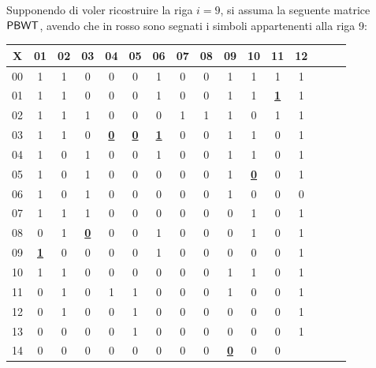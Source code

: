 \begin{esempio}
   Supponendo di voler ricostruire la riga $i=9$, si assuma la seguente matrice
   $\mbox{\rm {\sf PBWT}}$, avendo che in rosso sono segnati i simboli appartenenti alla riga 9: 
   \begin{table}[H]
     \centering
     \footnotesize
     \begin{tabular}{c|ccccccccccccccc}
       X & 01 & 02 & 03 & 04 & 05 & 06 & 07 & 08 & 09 & 10 & 11 & 12 \\
       \hline
       00 & 1 & 1 & 0 & 0 & 0 & 1 & 0 & 0 & 1 & 1 & 1 & 1 \\
       01 & 1 & 1 & 0 & 0 & 0 & 1 & 0 & 0 & 1 & 1 & {\color{nordred}\textbf{\underline{1}}}
                                                                & 1 \\
       02 & 1 & 1 & 1 & 0 & 0 & 0 & 1 & 1 & 1 & 0 & 1 & 1 \\
       03 & 1 & 1 & 0 & {\color{nordred}\textbf{\underline{0}}} & {\color{nordred}\textbf{\underline{0}}}
                                  & {\color{nordred}\textbf{\underline{1}}} & 0 & 0 & 1 & 1
                                                           & 0 & 1 \\
       04 & 1 & 0 & 1 & 0 & 0 & 1 & 0 & 0 & 1 & 1 & 0 & 1 \\
       05 & 1 & 0 & 1 & 0 & 0 & 0 & 0 & 0 & 1 & {\color{nordred}\textbf{\underline{0}}} & 0
                                                                & 1 \\
       06 & 1 & 0 & 1 & 0 & 0 & 0 & 0 & 0 & 1 & 0 & 0 & 0 \\
       07 & 1 & 1 & 1 & 0 & 0 & 0 & 0 & 0 & 0 & 1 & 0 & 1 \\
       08 & 0 & 1 & {\color{nordred}\textbf{\underline{0}}} & 0 & 0 & 1 & 0 & 0 & 0 & 1 & 0
                                                                & 1 \\
       09 & {\color{nordred}\textbf{\underline{1}}} & 0 & 0 & 0 & 0 & 1 & 0 & 0 & 0 & 0 & 0
                                                                & 1 \\
       10 & 1 & 1 & 0 & 0 & 0 & 0 & 0 & 0 & 1 & 1 & 0 & 1 \\
       11 & 0 & 1 & 0 & 1 & 1 & 0 & 0 & 0 & 1 & 0 & 0 & 1 \\
       12 & 0 & 1 & 0 & 0 & 1 & 0 & 0 & 0 & 0 & 0 & 0 & 1 \\
       13 & 0 & 0 & 0 & 0 & 1 & 0 & 0 & 0 & 0 & 0 & 0 & 1 \\
       14 & 0 & 0 & 0 & 0 & 0 & 0 & 0 & 0 & {\color{nordred}\textbf{\underline{0}}} & 0 & 0

\end{tabular}
\end{table}
\end{esempio}
